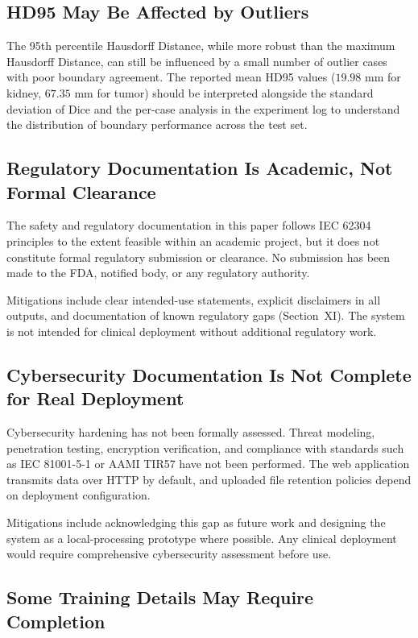 \subsection{HD95 May Be Affected by Outliers}

The 95th percentile Hausdorff Distance, while more robust than the maximum Hausdorff Distance, can still be influenced by a small number of outlier cases with poor boundary agreement. The reported mean HD95 values ($19.98$ mm for kidney, $67.35$ mm for tumor) should be interpreted alongside the standard deviation of Dice and the per-case analysis in the experiment log to understand the distribution of boundary performance across the test set.

\subsection{Regulatory Documentation Is Academic, Not Formal Clearance}

The safety and regulatory documentation in this paper follows IEC 62304 principles to the extent feasible within an academic project, but it does not constitute formal regulatory submission or clearance. No submission has been made to the FDA, notified body, or any regulatory authority. 

Mitigations include clear intended-use statements, explicit disclaimers in all outputs, and documentation of known regulatory gaps (Section~XI). The system is not intended for clinical deployment without additional regulatory work.

\subsection{Cybersecurity Documentation Is Not Complete for Real Deployment}

Cybersecurity hardening has not been formally assessed. Threat modeling, penetration testing, encryption verification, and compliance with standards such as IEC 81001-5-1 or AAMI TIR57 have not been performed. The web application transmits data over HTTP by default, and uploaded file retention policies depend on deployment configuration.

Mitigations include acknowledging this gap as future work and designing the system as a local-processing prototype where possible. Any clinical deployment would require comprehensive cybersecurity assessment before use.

\subsection{Some Training Details May Require Completion}

